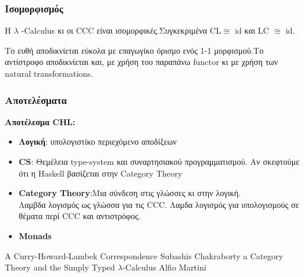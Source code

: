 \documentclass[hyperref={pdfpagelabels=false}]{beamer}
\begin{document}
\begin{frame}
	\frametitle{Ισομορφισμός
	}
\begin{theorem}
Η $\lambda$ -Calculus κι οι CCC είναι ισομορφικές.Συγκεκριμένα CL$\cong$ id και LC $\cong$ id.
\end{theorem}
Το ευθή αποδικνίεται εύκολα με επαγωγίκο όρισμο ενός 1-1 μορφισμού.Το αντίστροφο αποδικνίεται και, με χρήση του παραπάνω functor κι με χρήση των natural transformations.
\end{frame}
\begin{frame}
	\frametitle{Αποτελέσματα}
	\textbf{Αποτέλεσμα CHL:}
\begin{itemize}
	\item {\textbf{Λογική}: υπολογιστίκο περιεχόμενο αποδίξεων }
\item<2-> {\textbf{CS}: Θεμέλεια type-system και συναρτησιακού προγραμματισμού. Αν σκεφτούμε ότι η Haskell βασίζεται στην  Category Theory}
\item<3-> {\textbf{Category Theory}:Μια σύνδεση στις γλώσσες κι στην λογική. 
\\
Λαμβδα λογισμός ως γλώσσα για τις CCC.
Λαμδα λογισμός για υπολογισμούς σε θέματα περί CCC και αντιστρόφος.}
\item<4-> {\textbf{Monads}}
\end{itemize}
\end{frame}

\begin{frame}
  \begin{thebibliography}{10}
    
 
    
  \beamertemplatearticlebibitems

  \bibitem A Curry-Howard-Lambek Correspondence
    Subashis Chakraborty
  \bibitem a Category Theory and the Simply Typed $\lambda$-Calculus
    Alfio Martini
  \end{thebibliography}
\end{frame}
\end{document}
